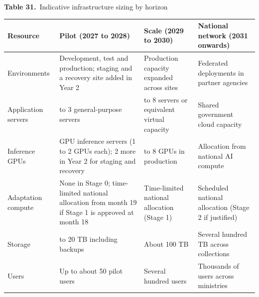 \documentclass[border=10pt]{standalone}
\begin{document}
\begin{minipage}{17cm}
{\large\bfseries Table 31.}\ {\large Indicative infrastructure sizing by horizon}\par\vspace{7pt}
\small
{}
\begin{tabularx}{\linewidth}{@{}>{\hsize=0.828\hsize\raggedright\arraybackslash}X>{\hsize=1.057\hsize\raggedright\arraybackslash}X>{\hsize=1.057\hsize\raggedright\arraybackslash}X>{\hsize=1.057\hsize\raggedright\arraybackslash}X@{}}
\arrayrulecolor{bapilrule}\toprule
\rowcolor{white}\textbf{Resource} & \textbf{Pilot (2027 to 2028)} & \textbf{Scale (2029 to 2030)} & \textbf{National network (2031 onwards)} \\
\midrule
Environments & Development, test and production; staging and a recovery site added in Year 2 & Production capacity expanded across sites & Federated deployments in partner agencies \\
Application servers & 2 to 3 general-purpose servers & 6 to 8 servers or equivalent virtual capacity & Shared government cloud capacity \\
Inference GPUs & 2 GPU inference servers (1 to 2 GPUs each); 2 more in Year 2 for staging and recovery & 4 to 8 GPUs in production & Allocation from national AI compute \\
Adaptation compute & None in Stage 0; time-limited national allocation from month 19 if Stage 1 is approved at month 18 & Time-limited national allocation (Stage 1) & Scheduled national allocation (Stage 2 if justified) \\
Storage & 10 to 20 TB including backups & About 100 TB & Several hundred TB across collections \\
Users & Up to about 50 pilot users & Several hundred users & Thousands of users across ministries \\
\bottomrule
\end{tabularx}
\par\vspace{5pt}{\footnotesize\itshape Planning assumptions for the Phase 0 feasibility and costing study (Section 15.1), not procurement specifications. The pilot column matches the equipment in the budget (Table 49).}
\par{}
\end{minipage}
\end{document}
